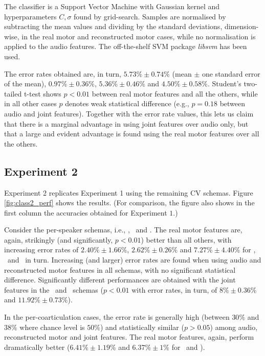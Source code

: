 The classifier is a Support Vector Machine \cite{BGV92} with Gaussian kernel
and hyperparameters $C, \sigma$ found by grid-search. Samples are normalised
by subtracting the mean values and dividing by the standard deviations,
dimension-wise, in the real motor and reconstructed motor cases, while
no normalisation is applied to the audio features. The off-the-shelf SVM
package \emph{libsvm} \cite{libsvm} has been used.

The error rates obtained are, in turn,
$5.73\% \pm 0.74\%$ (mean $\pm$ one standard error of the mean),
$0.97\% \pm 0.36\%$,
$5.36\% \pm 0.46\%$ and
$4.50\% \pm 0.58\%$. Student's two-tailed t-test shows $p<0.01$ between real motor features
and all the others, while in all other cases $p$ denotes weak statistical difference (e.g.,
$p=0.18$ between audio and joint features). Together with the error rate values, this lets
us claim that there is a marginal advantage in using joint features
over audio only, but that a large and evident advantage is found using the real motor features
over all the others.

\subsection{Experiment 2}
\label{subsec:exp2}

Experiment 2 replicates Experiment 1 using the remaining CV schemas.
Figure \ref{fig:class2_perf} shows the results. (For comparison,
the figure also shows in the first column the accuracies obtained for
Experiment $1$.)

Consider the per-speaker schemas, i.e., \spka, \spkb\ and \spkc. The real motor
features are, again, strikingly (and significantly, $p<0.01$) better than all others,
with increasing error rates of
$2.40\% \pm 1.66\%$,
$2.62\% \pm 0.26\%$ and
$7.27\% \pm 4.40\%$ for \spka, \spkb\ and \spkc\ in turn. Increasing (and larger) error
rates are found when using audio and reconstructed motor features in all schemas, with
no significant statistical difference. Significantly different performances are obtained
with the joint features in the \spkb\ and \spkc\ schemas ($p<0.01$ with error rates, in turn,
of $8\% \pm 0.36\%$ and $11.92\% \pm 0.73\%$).

In the per-coarticulation cases, the error rate is generally high (between $30\%$ and $38\%$
where chance level is $50\%$) and statistically similar ($p>0.05$) among audio, reconstructed
motor and joint features. The real motor features, again, perform dramatically better
($6.41\% \pm 1.19\%$ and $6.37\% \pm 1\%$ for \coa\ and \cob).


